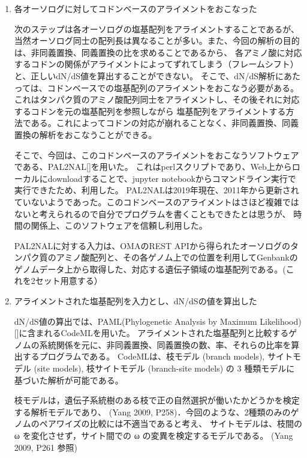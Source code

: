 \documentclass[a4j,12pt]{jreport}
\begin{document}
\begin{enumerate}
        \item 各オーソログに対してコドンベースのアライメントをおこなった
        
        次のステップは各オーソログの塩基配列をアライメントすることであるが、当然オーソログ同士の配列長は異なることが多い。また、今回の解析の目的は、非同義置換、同義置換の比を求めることであるから、
        各アミノ酸に対応するコドンの関係がアライメントによってずれてしまう（フレームシフト）と、正しいdN/dS値を算出することができない。
        そこで、dN/dS解析にあたっては、コドンベースでの塩基配列のアライメントをおこなう必要がある。これはタンパク質のアミノ酸配列同士をアライメントし、その後それに対応するコドンを元の塩基配列を参照しながら
        塩基配列をアライメントする方法である。これによってコドンの対応が崩れることなく、非同義置換、同義置換の解析をおこなうことができる。
        
        そこで、今回は、このコドンベースのアライメントをおこなうソフトウェアである、PAL2NAL[]を用いた。
        これはperlスクリプトであり、Web上からローカルにdownloadすることで、jupyter notebookからコマンドライン実行で実行できたため、利用した。
        PAL2NALは2019年現在、2011年から更新されていないようであった。このコドンベースのアライメントはさほど複雑ではないと考えられるので自分でプログラムを書くこともできたとは思うが、
        時間の関係上、このソフトウェアを信頼し利用した。
        
        PAL2NALに対する入力は、OMAのREST APIから得られたオーソログのタンパク質のアミノ酸配列と、その各ゲノム上での位置を利用してGenbankのゲノムデータ上から取得した、対応する遺伝子領域の塩基配列である。(これを2セット用意する）

        \item アライメントされた塩基配列を入力とし、dN/dSの値を算出した
        
        dN/dS値の算出では、PAML(Phylogenetic Analysis by Maximum Likelihood) []に含まれるCodeMLを用いた。
        アライメントされた塩基配列と比較するゲノムの系統関係を元に、非同義置換、同義置換の数、率、それらの比率を算出するプログラムである。
        CodeMLは、枝モデル (branch models), サイトモデル (site models), 枝サイトモデル (branch-site models) の 3 種類モデルに基づいた解析が可能である。

        枝モデルは，遺伝子系統樹のある枝で正の自然選択が働いたかどうかを検定する解析モデルであり、 (Yang 2009, P258)．今回のような、2種類のみのゲノムのペアワイズの比較には不適当であると考え、
        サイトモデルは、枝間の ω を変化させず，サイト間での ω の変異を検定するモデルである。 (Yang 2009, P261 参照)

    \end{enumerate}
\end{document}
